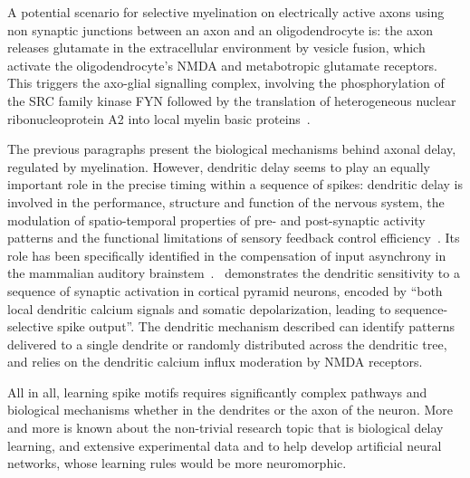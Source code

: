 \documentclass[brainsci, %
               review,submit,pdftex,moreauthors
               ]{Definitions/mdpi}
\begin{document}
A potential scenario for selective myelination on electrically active axons using non synaptic junctions between an axon and an oligodendrocyte is: the axon releases glutamate in the extracellular environment by vesicle fusion, which activate the oligodendrocyte's NMDA and metabotropic glutamate receptors. This triggers the axo-glial signalling complex, involving the phosphorylation of the SRC family kinase FYN followed by the translation of heterogeneous nuclear ribonucleoprotein A2 into local myelin basic proteins~\citep{fields_new_2015}.

The previous paragraphs present the biological mechanisms behind axonal delay, regulated by myelination. However, dendritic delay seems to play an equally important role in the precise timing within a sequence of spikes: dendritic delay is involved in the performance, structure and function of the nervous system, the modulation of spatio-temporal properties of pre- and post-synaptic activity patterns and the functional limitations of sensory feedback control efficiency~\citep{madadi_asl_dendritic_2018}. Its role has been specifically identified in the compensation of input asynchrony in the mammalian auditory brainstem~\citep{spencer_compensation_2018}.~\citet{branco_dendritic_2010} demonstrates the dendritic sensitivity to a sequence of synaptic activation in cortical pyramid neurons, encoded by ``both local dendritic calcium signals and somatic depolarization, leading to sequence-selective spike output''. The dendritic mechanism described can identify patterns delivered to a single dendrite or randomly distributed across the dendritic tree, and relies on the dendritic calcium influx moderation by NMDA receptors.

All in all, learning spike motifs requires significantly complex pathways and biological mechanisms whether in the dendrites or the axon of the neuron. More and more is known about the non-trivial research topic that is biological delay learning, and extensive experimental data and to help develop artificial neural networks, whose learning rules would be more neuromorphic. 
%
\end{document}
